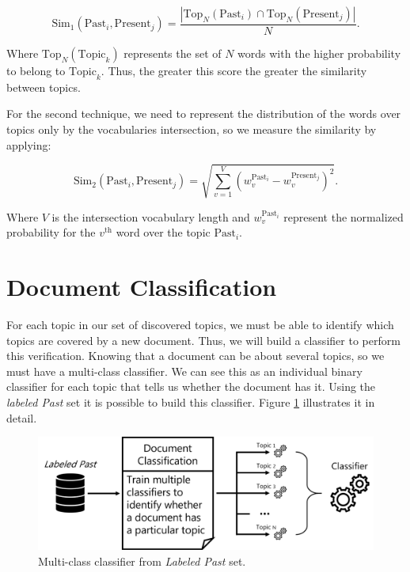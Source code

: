 \begin{equation}
	\label{eq:top-n-match}
	\text{Sim}_{1}\left(\text{Past}_{i}, \text{Present}_{j}\right) = \dfrac{|\text{Top}_{N}(\text{Past}_{i}) \cap \text{Top}_{N}(\text{Present}_{j})|}{N} \text{.}
\end{equation}

Where $\text{Top}_{N}(\text{Topic}_{k})$ represents the set of $N$ words with the higher probability to belong to $\text{Topic}_{k}$. Thus, the greater this score the greater the similarity between topics.

For the second technique, we need to represent the distribution of the words over topics only by the vocabularies intersection, so we measure the similarity by applying:

\begin{equation}
	\label{eq:global-match}
	\text{Sim}_{2}\left(\text{Past}_{i}, \text{Present}_{j}\right) = \sqrt{\sum_{v=1}^{V} \left(w_{v}^{\text{Past}_{i}} - w_{v}^{\text{Present}_{j}}\right)^2} \text{.}
\end{equation}

Where $V$ is the intersection vocabulary length and $w_{v}^{\text{Past}_{i}}$ represent the normalized probability for the $v^{\text{th}}$ word over the topic $\text{Past}_{i}$.

\section{Document Classification}

For each topic in our set of discovered topics, we must be able to identify which topics are covered by a new document. Thus, we will build a classifier to perform this verification. Knowing that a document can be about several topics, so we must have a multi-class classifier. We can see this as an individual binary classifier for each topic that tells us whether the document has it. Using the \textit{labeled Past} set it is possible to build this classifier. Figure \ref{fig:document-classification} illustrates it in detail.

\begin{figure}[h!]
	\centering
	\includegraphics[width=0.9\linewidth]{01.Chapters/04.Materials/document-classification}
	\caption{Multi-class classifier from \textit{Labeled Past} set.}
	\label{fig:document-classification}
\end{figure}

